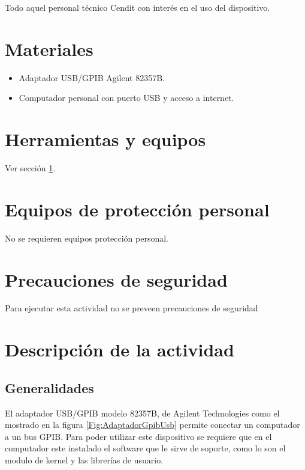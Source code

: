 \documentclass[paper=letter,oneside,fontsize=11pt, parskip=full]{scrartcl}
\begin{document}
		Todo aquel personal técnico Cendit con interés en el uso del dispositivo.
		
	\section{Materiales}
		\label{Sec:SeccionMateriales}
		\begin{itemize}
			\item Adaptador USB/GPIB Agilent 82357B.
			\item Computador personal con puerto USB y acceso a internet.
		\end{itemize}	
			
	\section{Herramientas y equipos}
		
		Ver sección \ref{Sec:SeccionMateriales}.

	
	\section{Equipos de protección personal}
	
		No se requieren equipos protección personal.
		
	\section{Precauciones de seguridad}
	
		Para ejecutar esta actividad no se preveen precauciones de seguridad
		
	\section{Descripción de la actividad}
	
		\subsection{Generalidades}
	
		El adaptador USB/GPIB modelo 82357B, de Agilent Technologies como el mostrado en la figura \ref{Fig:AdaptadorGpibUsb} permite conectar un computador a un bus GPIB. Para poder utilizar este dispositivo se requiere que en el computador este instalado el software que le sirve de soporte, como lo son el modulo de kernel y las librerías de usuario.	
		
\end{document}
